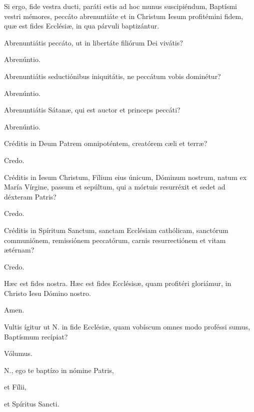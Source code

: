 Si ergo, fide vestra ducti, paráti estis ad hoc munus suscipiéndum, Baptísmi
vestri mémores, peccáto abrenuntiáte et in Christum Iesum profitémini
fidem, quæ est fides Ecclésiæ, in qua párvuli baptizántur.

 Abrenuntiátis peccáto, ut in libertáte filiórum Dei vivátis?

 Abrenúntio.

 Abrenuntiátis seductiónibus iniquitátis, ne peccátum vobis dominétur?

 Abrenúntio.

 Abrenuntiátis Sátanæ, qui est auctor et princeps peccáti?

 Abrenúntio.


Créditis in Deum Patrem omnipoténtem, creatórem cæli et terræ?

 Credo.

 Créditis in Iesum Christum, Fílium eius únicum, Dóminum nostrum, natum ex
María Vírgine, passum et sepúltum, qui a mórtuis resurréxit et sedet ad déxteram Patris?

 Credo.

 Créditis in Spíritum Sanctum, sanctam Ecclésiam cathólicam,
sanctórum communiónem, remissiónem peccatórum, carnis resurrectiónem et vitam ætérnam?

 Credo.

 Hæc est fides nostra. Hæc est fides Ecclésisæ, quam profitéri gloriámur,
in Christo Iesu Dómino nostro.

 Amen.



Vultis ígitur ut {\color{red}N.} in fide Ecclésiæ, quam vobíscum omnes modo proféssi sumus, Baptísmum recípiat?

 Vólumus.


{\color{red}N.}, ego te baptízo in nómine Patris,


et Fílii,


et Spíritus Sancti.

